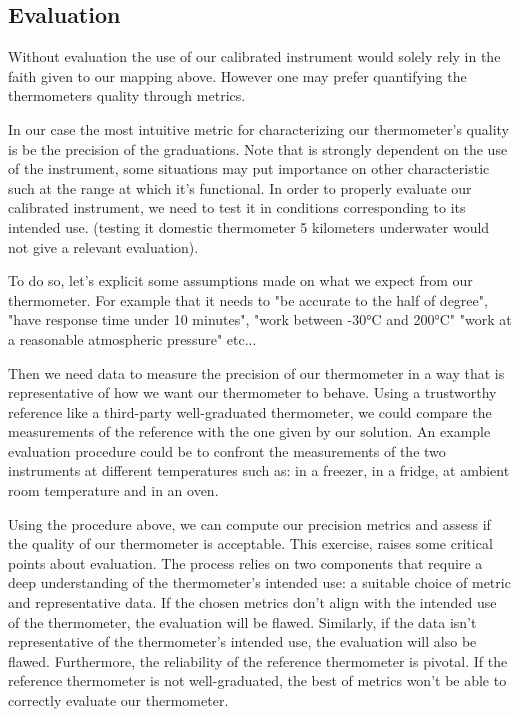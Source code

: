 \begin{bibunit}
\subsection{Evaluation}

Without evaluation the use of our calibrated instrument would solely rely in the faith given to our mapping above.
However one may prefer quantifying the thermometers quality through metrics.

In our case the most intuitive metric for characterizing our thermometer's quality is be the precision of the graduations.
Note that is strongly dependent on the use of the instrument, some situations may put importance on other characteristic such at the range at which it's functional.
In order to properly evaluate our calibrated instrument, we need to test it in conditions corresponding to its intended use. (testing it domestic thermometer 5 kilometers underwater would not give a relevant evaluation).

 To do so, let's explicit some assumptions made on what we expect from our thermometer.
  For example that it needs to "be accurate to the half of degree", "have response time under 10 minutes", "work between -30°C and 200°C" "work at a reasonable atmospheric pressure" etc...

Then we need data to measure the precision of our thermometer in a way that is representative of how we want our thermometer to behave. Using a trustworthy reference like a third-party well-graduated thermometer, we could compare the measurements of the reference with the one given by our solution.
  An example evaluation procedure could be to confront the measurements of the two instruments at different temperatures such as: in a freezer, in a fridge, at ambient room temperature and in an oven.

Using the procedure above, we can compute our precision metrics and assess if the quality of our thermometer is acceptable.
This exercise, raises some critical points about evaluation. The process relies on two components that require a deep understanding of the thermometer's intended use: a suitable choice of metric and representative data. If the chosen metrics don't align with the intended use of the thermometer, the evaluation will be flawed. Similarly, if the data isn't representative of the thermometer's intended use, the evaluation will also be flawed.
 Furthermore, the reliability of the reference thermometer is pivotal. If the reference thermometer is not well-graduated, the best of metrics won't be able to correctly evaluate our thermometer. 


\end{bibunit}
